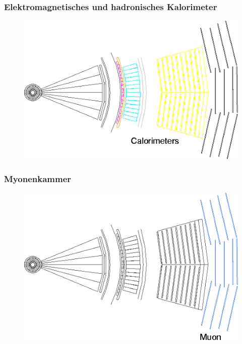 \begin{frame}
	\frametitle{Elektromagnetisches und hadronisches Kalorimeter}
	\begin{center}
		\begin{figure}
			\includegraphics[width=0.75\linewidth]{graphics/slice_calorimeter_tr}
		\end{figure}
	\end{center}
\end{frame}

\begin{frame}
	\frametitle{Myonenkammer}
	\begin{center}
		\begin{figure}
			\includegraphics[width=0.75\linewidth]{graphics/slice_muon_tr}
		\end{figure}
	\end{center}
\end{frame}


